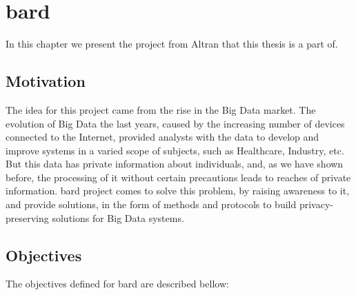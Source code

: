 %

\acresetall

\chapter{\acs{bard}}
\label{ch:BARD}


In this chapter we present the project from Altran that this thesis is a part of. 





\section{Motivation}
\label{sec:Motivation}

The idea for this project came from the rise in the Big Data market. The evolution of Big Data the last years, caused by the increasing number of devices connected to the Internet, provided analysts with the data to develop and improve systems in a varied scope of subjects, such as Healthcare, Industry, etc. But this data has private information about individuals, and, as we have shown before, the processing of it without certain precautions leads to reaches of private information. \ac{bard} project comes to solve this problem, by raising awareness to it, and provide solutions, in the form of methods and protocols to build privacy-preserving solutions for Big Data systems.

\section{Objectives}
\label{sec:Objectives}

The objectives defined for \ac{bard} are described bellow:

